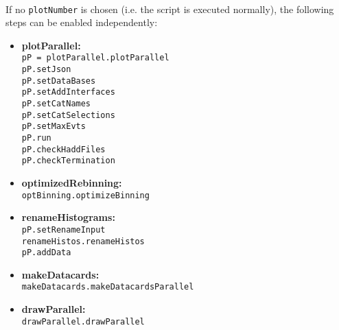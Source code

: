 \documentclass[12pt, a4paper]{article}
\begin{document}
~\\
If no \texttt{plotNumber} is chosen (i.e. the script is executed normally), the following steps can be enabled independently:
		\begin{itemize}
			\item \textbf{plotParallel:}\\
				\texttt{pP = plotParallel.plotParallel}\\
				\texttt{pP.setJson}\\
				\texttt{pP.setDataBases}\\
				\texttt{pP.setAddInterfaces}\\
				\texttt{pP.setCatNames}\\
				\texttt{pP.setCatSelections}\\
				\texttt{pP.setMaxEvts}\\
				\texttt{pP.run}\\
				\texttt{pP.checkHaddFiles}\\
				\texttt{pP.checkTermination}
				
			\item \textbf{optimizedRebinning:}\\
				\texttt{optBinning.optimizeBinning}
				
			\item \textbf{renameHistograms:}\\
				\texttt{pP.setRenameInput}\\
				\texttt{renameHistos.renameHistos}\\
				\texttt{pP.addData}
				
			\item \textbf{makeDatacards:}\\
				\texttt{makeDatacards.makeDatacardsParallel}
				
			\item \textbf{drawParallel:}\\
				\texttt{drawParallel.drawParallel}
		\end{itemize}
		
\end{document}
